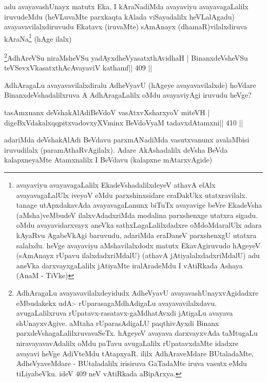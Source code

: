 \begin{artha}
adu avayavashUnayx matutx Eka, I kAraNadiMda avayaviyu avayavagaLalilx 
iruvudeMdu (heVLuvaMte parxkaqta kAlada viSayadalilx heVLalAgadu) 
avayavavilalxdiruvudu Ekatavx (iruvaMte) sAmAnayx (dhamaR)vilalxdiruva 
kAraNa\footnote{avayaviyu avayavagaLalilx EkadeVshadalilxdeyeV 
athavA elAlx avayavagaLalUlx iveyoV eMdu parxshinxsidare eraDakUkx 
utatxravilalx. tanage utApxdakavAda avayavagaLanunx biTuTx avayavige 
beVre EkadeVsha (aMsha)veMbudeV ilalxvAdadxriMda modalina parxshenxge 
utatxra sigadu. oMdu avayavidarxvayx aneVka sathxLagaLalilxdadxre oMdoMdaralUlx adara kAyaRvu AgabeVkAgi baruvudu, adariMda eraDaneV parxshenxgU utatxra salalxdu. heVge avayaviyu aMshavilalxdodx matutx EkavAgiruvudo hAgeyeV (sAmAnayx rUpavu ilalxdadxriMdalU) (athavA jAtiyalalxdadxriMdalU) adu aneVka darxvayxgaLalilx jAtiyaMte iralAradeMdu I vAtiRkada Ashaya (AnaM - TiVke)} (hAge ilalx) 
\end{artha}


\begin{shl}
\footnote{AdhAragaLu avayavavilalxdeyidudx AdheVyavU  avayavashUnayxvAgidadxre eMbudakekx udA:- rUparasagaMdhAdigaLu  avayavavilalxdavu. avugaLalilxruva rUpatavx-rasatavx-gaMdhatAvxdi  jAtigaLu avayava shUnayxvAgive. aMtaha rUparasAdigaLU paqthivAyxdi  Binanx parxdeVshagaLalilxruvavaSeTx. hAgeyeV avayava darxvayxvAda taMtugaLu niravayavavAdalilx oMdu paTavu avugaLalilx rUpatavxdaMte idadxre avayavi heVge AdiVteMdu tAtapxyaR. ililx AdhAraveMdare BUtaladaMte, AdheVyaveMdare - BUtaladalilx irisiruva GaTadaMte iruva vasutx eMdu tiLiyabeVku. ideV 409 neV vAtiRkada aBipArxya.}AdhAreVSu niraMsheVSu yadAyxdheVyasatxthAvidhaH |
BinanxdeVsheVSu teVSevxVkasatxthAcAvayaviV kathamf\hfill || 409 ||
\end{shl}

\begin{artha}
AdhAragaLu avayavavilalxdiralu AdheVyavU (hAgeye avayavavilalxde) hoVdare BinanxdeVshadalilxruva A AdhAragaLalilx oMdu avayaviyAgi iruvudu heVge?
\end{artha}

\begin{shl}
tasAmxnanx deVshakAlAdiBeVdoV vasAtxvXsharxyoV miteVH |
digeBxVdakalxqqpitxvadovxyXVminx BeVdoV\s yaM tadavxdAtamxni\hfill || 410 ||
\end{shl}

\begin{artha}
adariMda deVshakAlAdi BeVdavu parxmANadiMda vasutxvanunx avalaMbisi 
iruvudilalx (paramAthaRvAgilalx). Adare AkAshadalilx deVsha BeVda 
kalapxneyaMte Atamxnalilx I BeVdavu (kalapxne mAtarxvAgide)
\end{artha}

